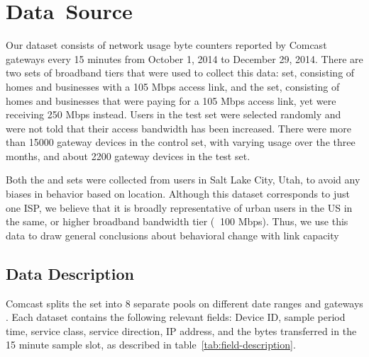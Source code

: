 \section{\mbox{Data Source}}
\label{sec:data}
Our dataset consists of network usage byte counters reported by Comcast gateways every 15 minutes from October 1, 2014 to December 29, 2014. There are two sets of broadband tiers that were used to collect this data: \control set, consisting of homes and businesses with a 105 Mbps access link, and the \test set, consisting of homes and businesses that were paying for a 105 Mbps access link, yet were receiving 250 Mbps instead. Users in the test set were selected randomly and were not told that their access bandwidth has been increased. There were more than 15000 gateway devices in the control set, with varying usage over the three months, and about 2200 gateway devices in the test set.

Both the \test and \control sets were collected from users in Salt Lake City, Utah, to avoid any biases in behavior based on location. Although this dataset corresponds to just one ISP, we believe that it is broadly representative of urban users in the US in the same, or higher broadband bandwidth tier ($\>$ 100 Mbps). Thus, we use this data to draw general conclusions about behavioral change with link capacity 



\subsection{Data Description}

Comcast splits the \control set into 8 separate pools on different date ranges and gateways . Each dataset contains the following relevant fields: Device ID, sample period time, service class, service direction, IP address, and the bytes transferred in the 15 minute sample slot, as described in table~\ref{tab:field-description}. 

